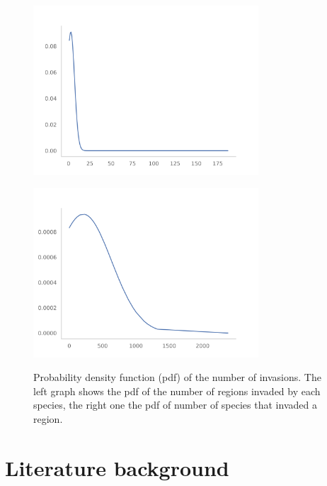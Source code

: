 \documentclass[mscthesis]{usiinfthesis}
\begin{document}
\begin{figure}
\centering
\begin{minipage}{.5\textwidth}
  \centering
    \includegraphics[width=0.75\textwidth]{species_region_invasion.png}
    \label{fig:pdf_invasion_filtered}
\end{minipage}%
\begin{minipage}{.5\textwidth}
  \centering
    \includegraphics[width=0.75\textwidth]{region_species_invasion.png}
    \label{fig:pdf_invasion_filtered}
\end{minipage}
\caption{Probability density function (pdf) of the number of invasions. The left graph shows the pdf of the number of regions invaded by each species, the right one the pdf of number of species that invaded a region.}
\end{figure}

\chapter{Literature background}
\end{document}
